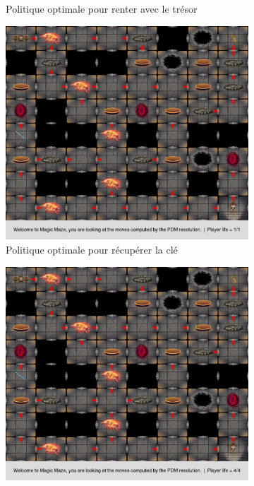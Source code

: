 \documentclass[a4paper]{article}
\theoremstyle{plain}
\begin{document}
\begin{figure}
\begin{subfigure}[b]{0.48\textwidth}
		\caption{Politique optimale pour renter avec le trésor}
	\end{subfigure}
	\begin{subfigure}[b]{0.48\textwidth}
		\includegraphics[width=\textwidth]{dungeonSujet_sol.jpeg}
		\caption{Politique optimale pour récupérer la clé}
		\label{fig:dclé}
	\end{subfigure}
	\begin{subfigure}[b]{0.48\textwidth}
		\includegraphics[width=\textwidth]{dungeonSujet_sol_life4.jpeg}

\end{subfigure}
\end{figure}
\end{document}
